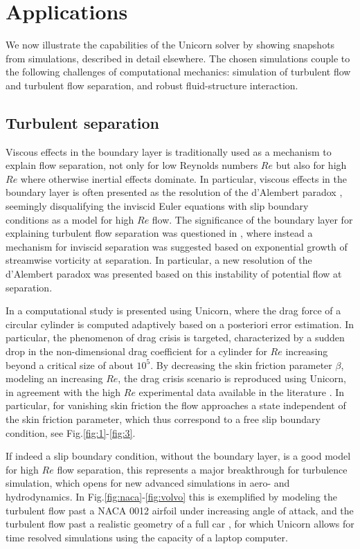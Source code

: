 \section{Applications}

We now illustrate the capabilities of the Unicorn solver by showing
snapshots from simulations, described in detail elsewhere. The chosen
simulations couple to the following challenges of computational
mechanics: simulation of turbulent flow and turbulent flow separation,
and robust fluid-structure interaction.

\subsection{Turbulent separation}

Viscous effects in the boundary layer is traditionally used as a
mechanism to explain flow separation, not only for low Reynolds
numbers $Re$ but also for high $Re$ where otherwise inertial effects
dominate. In particular, viscous effects in the boundary layer is
often presented as the resolution of the d'Alembert
paradox \cite{Stewartson1981}, seemingly disqualifying the inviscid
Euler equations with slip boundary conditions as a model for high $Re$
flow.
%
The significance of the boundary layer for explaining turbulent flow
separation was questioned in \cite{HoffmanJohnson2008a}, where instead
a mechanism for inviscid separation was suggested based on exponential
growth of streamwise vorticity at separation. In particular, a new
resolution of the d'Alembert paradox was presented based on this
instability of potential flow at separation.

In \cite{JanssonHoffman2009} a computational study is presented using
Unicorn, where the drag force of a circular cylinder is computed
adaptively based on a posteriori error estimation. In particular, the
phenomenon of drag crisis is targeted, characterized by a sudden drop
in the non-dimensional drag coefficient for a cylinder for $Re$
increasing beyond a critical size of about $10^5$. By decreasing the
skin friction parameter $\beta$, modeling an increasing $Re$, the drag
crisis scenario is reproduced using Unicorn, in agreement with the
high $Re$ experimental data available in the
literature \cite{Zdravkovich2003}. In particular, for vanishing skin
friction the flow approaches a state independent of the skin friction
parameter, which thus correspond to a free slip boundary condition,
see Fig.\ref{fig:1}-\ref{fig:3}.

If indeed a slip boundary condition, without the boundary layer, is a
good model for high $Re$ flow separation, this represents a major
breakthrough for turbulence simulation, which opens for new advanced
simulations in aero- and hydrodynamics. In
Fig.\ref{fig:naca}-\ref{fig:volvo} this is exemplified by modeling the
turbulent flow past a NACA 0012 airfoil under increasing angle of
attack, and the turbulent flow past a realistic geometry of a full
car \cite{HoffmanJohnson2006}, for which Unicorn allows for time
resolved simulations using the capacity of a laptop computer.


